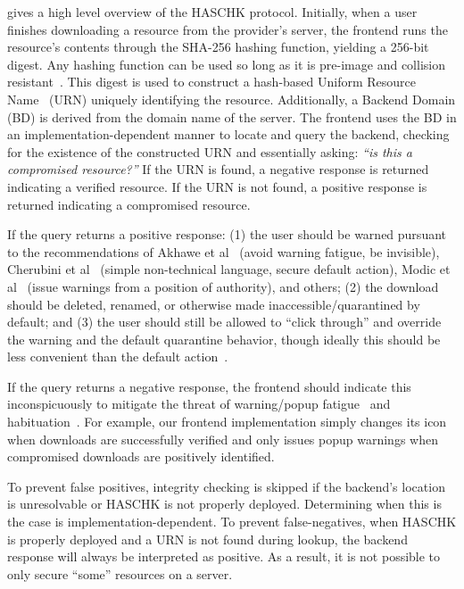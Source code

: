  gives a high level overview of the HASCHK protocol.
Initially, when a user finishes downloading a resource from the provider's
server, the frontend runs the resource's contents through the SHA-256 hashing
function, yielding a 256-bit digest. Any hashing function can be used so long as
it is pre-image and collision resistant~\cite{Rogaway}. This digest is used to
construct a hash-based Uniform Resource Name~\cite{draft-URN} (URN) uniquely identifying the
resource. Additionally, a Backend Domain (BD) is derived from the domain name of
the server. The frontend uses the BD in an implementation-dependent manner to
locate and query the backend, checking for the existence of the constructed URN
and essentially asking: \emph{``is this a compromised resource?''} If the URN is
found, a negative response is returned indicating a verified resource. If the
URN is not found, a positive response is returned indicating a compromised
resource.

If the query returns a positive response: (1) the user should be warned pursuant
to the recommendations of Akhawe et al~\cite{Akhawe} (avoid warning fatigue, be
invisible), Cherubini et al~\cite{Cherubini} (simple non-technical language,
secure default action), Modic et al~\cite{Modic} (issue warnings from a position
of authority), and others; (2) the download should be deleted, renamed, or
otherwise made inaccessible/quarantined by default; and (3) the user should
still be allowed to ``click through'' and override the warning and the default
quarantine behavior, though ideally this should be less convenient than the
default action~\cite{Cherubini}.

If the query returns a negative response, the frontend should indicate this
inconspicuously to mitigate the threat of warning/popup fatigue~\cite{Akhawe,
Cherubini} and habituation~\cite{Sunshine}. For example, our frontend
implementation simply changes its icon when downloads are successfully verified
and only issues popup warnings when compromised downloads are positively
identified.

To prevent false positives, integrity checking is skipped if the backend's
location is unresolvable or HASCHK is not properly deployed. Determining when
this is the case is implementation-dependent. To prevent false-negatives, when
HASCHK is properly deployed and a URN is not found during lookup, the backend
response will always be interpreted as positive. As a result, it is not possible
to only secure ``some'' resources on a server.

